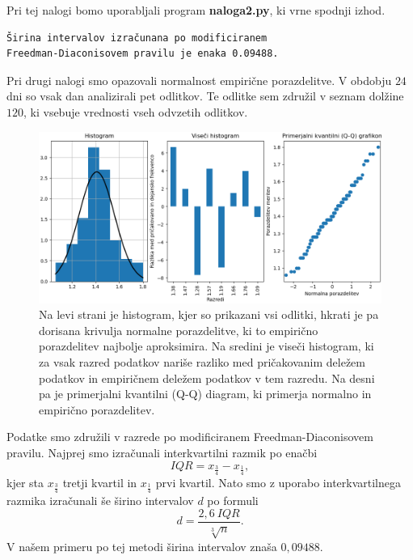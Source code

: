 \documentclass{article}
\begin{document}
Pri tej nalogi bomo uporabljali program \textbf{naloga2.py}, ki vrne spodnji
izhod.
\begin{verbatim}
Širina intervalov izračunana po modificiranem
Freedman-Diaconisovem pravilu je enaka 0.09488.
\end{verbatim}

Pri drugi nalogi smo opazovali normalnost empirične porazdelitve. V obdobju $24$
dni so vsak dan analizirali pet odlitkov. Te odlitke sem združil v 
seznam dolžine $120$, ki vsebuje vrednosti vseh odvzetih odlitkov.

\begin{figure}[H]
    \centering
    \includegraphics[scale=0.45]{2.png}
    \caption{Na levi strani je histogram, kjer so prikazani vsi odlitki, hkrati
    je pa dorisana krivulja normalne porazdelitve, ki to empirično porazdelitev
    najbolje aproksimira. Na sredini je viseči histogram, ki za vsak razred
    podatkov nariše razliko med pričakovanim deležem podatkov in empiričnem
    deležem podatkov v tem razredu. Na desni pa je primerjalni kvantilni (Q-Q)
    diagram, ki primerja normalno in empirično porazdelitev.}
    \label{slika 2}
\end{figure}

Podatke smo združili v razrede po modificiranem Freedman-Diaconisovem pravilu.
Najprej smo izračunali interkvartilni razmik po enačbi
\begin{equation*}
    IQR = x_\frac{3}{4} - x_\frac{1}{4},
\end{equation*}
kjer sta $x_\frac{3}{4}$ tretji kvartil in $x_\frac{1}{4}$ prvi kvartil. Nato
smo z uporabo interkvartilnega razmika izračunali še širino intervalov $d$ po
formuli
\begin{equation*}
    d = \frac{2{,}6\ IQR}{\sqrt[3]{n}}.
\end{equation*}
V našem primeru po tej metodi širina intervalov znaša $0{,}09488$.
\end{document}
